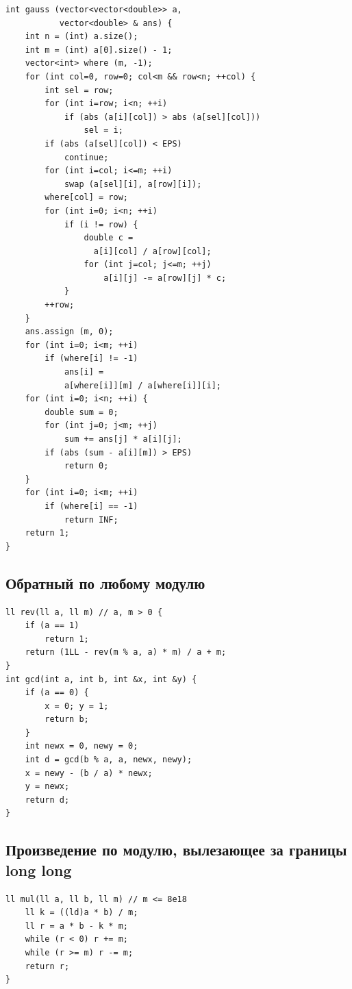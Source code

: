 \documentclass[10pt, portrait,letterpaper]{article}
\begin{document}
\begin{verbatim}
int gauss (vector<vector<double>> a,
           vector<double> & ans) {
    int n = (int) a.size();
    int m = (int) a[0].size() - 1;
    vector<int> where (m, -1);
    for (int col=0, row=0; col<m && row<n; ++col) {
        int sel = row;
        for (int i=row; i<n; ++i)
            if (abs (a[i][col]) > abs (a[sel][col]))
                sel = i;
        if (abs (a[sel][col]) < EPS)
            continue;
        for (int i=col; i<=m; ++i)
            swap (a[sel][i], a[row][i]);
        where[col] = row;
        for (int i=0; i<n; ++i)
            if (i != row) {
                double c = 
                  a[i][col] / a[row][col];
                for (int j=col; j<=m; ++j)
                    a[i][j] -= a[row][j] * c;
            }
        ++row;
    }
    ans.assign (m, 0);
    for (int i=0; i<m; ++i)
        if (where[i] != -1)
            ans[i] = 
            a[where[i]][m] / a[where[i]][i];
    for (int i=0; i<n; ++i) {
        double sum = 0;
        for (int j=0; j<m; ++j)
            sum += ans[j] * a[i][j];
        if (abs (sum - a[i][m]) > EPS)
            return 0;
    }
    for (int i=0; i<m; ++i)
        if (where[i] == -1)
            return INF;
    return 1;
}

\end{verbatim}

\subsection{Обратный по любому модулю}

\begin{verbatim}
ll rev(ll a, ll m) // a, m > 0 {
    if (a == 1)
        return 1;
    return (1LL - rev(m % a, a) * m) / a + m;
}
int gcd(int a, int b, int &x, int &y) {
	if (a == 0) {
		x = 0; y = 1;
		return b;
	}
	int newx = 0, newy = 0;
	int d = gcd(b % a, a, newx, newy);
	x = newy - (b / a) * newx;
	y = newx;
	return d;
}
\end{verbatim}

\subsection{Произведение по модулю, вылезающее за границы long long}
\begin{verbatim}
ll mul(ll a, ll b, ll m) // m <= 8e18
    ll k = ((ld)a * b) / m;
    ll r = a * b - k * m;
    while (r < 0) r += m;
    while (r >= m) r -= m;
    return r;
}
\end{verbatim}
\end{document}
